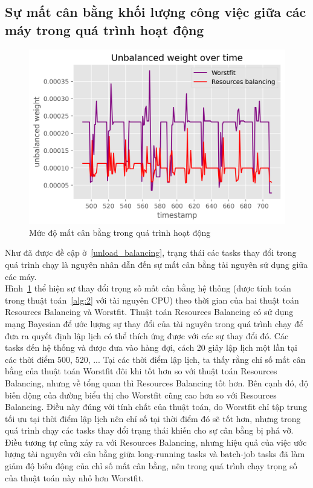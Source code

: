 \documentclass{my_style}
\begin{document}
\subsection{Sự mất cân bằng khối lượng công việc giữa các máy trong quá trình hoạt động}
\begin{figure}[h!]
	\centering
	\includegraphics[scale=0.75]{images/unbalanced_weights.png}
	\caption{Mức độ mất cân bằng trong quá trình hoạt động}
	\label{fig:realtime_weights}
\end{figure}

\noindent
Như đã được đề cập ở~\ref{unload_balancing}, trạng thái các tasks thay đổi trong quá trình chạy là nguyên nhân dẫn đến sự mất cân bằng tài nguyên sử dụng giữa các máy.\\
Hình~\ref{fig:realtime_weights} thể hiện sự thay đổi trọng số mất cân bằng hệ thống (được tính toán trong thuật toán~\ref{alg:2} với tài nguyên CPU) theo thời gian của hai thuật toán Resources Balancing và Worstfit. Thuật toán Resources Balancing có sử dụng mạng Bayesian để ước lượng sự thay đổi của tài nguyên trong quá trình chạy để đưa ra quyết định lập lịch có thể thích ứng được với các sự thay đổi đó. Các tasks đến hệ thống và được đưa vào hàng đợi, cách 20 giây lập lịch một lần tại các thời điểm 500, 520, ... Tại các thời điểm lập lịch, ta thấy rằng chỉ số mất cân bằng của thuật toán Worstfit đôi khi tốt hơn so với thuật toán Resources Balancing, nhưng về tổng quan thì Resources Balancing tốt hơn. Bên cạnh đó, độ biến động của đường biểu thị cho Worstfit cũng cao hơn so với Resources Balancing. Điều này đúng với tính chất của thuật toán, do Worstfit chỉ tập trung tối ưu tại thời điểm lập lịch nên chỉ số tại thời điểm đó sẽ tốt hơn, nhưng trong quá trình chạy các tasks thay đổi trạng thái khiến cho sự cân bằng bị phá vỡ. Điều tương tự cũng xảy ra với Resources Balancing, nhưng hiệu quả của việc ước lượng tài nguyên với cân bằng giữa long-running tasks và batch-job tasks đã làm giảm độ biến động của chỉ số mất cân bằng, nên trong quá trình chạy trọng số của thuật toán này nhỏ hơn Worstfit. 
\end{document}
